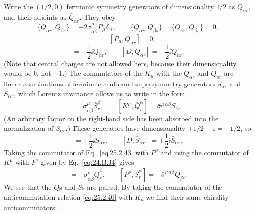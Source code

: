Write the \((1/2,0)\) fermionic symmetry generators of dimensionality
\(1/2\) as \(Q_{\alpha r}\), and their adjoints as
\(\bar Q_{\dot\alpha r}\).  They obey
\begin{equation}
\{Q_{\alpha r},\bar Q_{\dot\beta s}\}
=-2\sigma^\mu_{\alpha\dot\beta}P_\mu\delta_{rs},
\qquad
\{Q_{\alpha r},Q_{\beta s}\}
=\{\bar Q_{\dot\alpha r},\bar Q_{\dot\beta s}\}=0,
\tag{25.2.40}\label{eq:25.2.40}
\end{equation}
\begin{equation}
[P_\mu,Q_{\alpha r}]
=[P_\mu,\bar Q_{\dot\alpha r}]=0,
\tag{25.2.41}\label{eq:25.2.41}
\end{equation}
\begin{equation}
[D,Q_{\alpha r}]=-\frac12\ii Q_{\alpha r},
\qquad
[D,\bar Q_{\dot\alpha r}]=-\frac12\ii\bar Q_{\dot\alpha r}.
\tag{25.2.42}\label{eq:25.2.42}
\end{equation}
(Note that central charges are not allowed here, because their
dimensionality would be 0, not \(+1\).) The commutators of the \(K_\mu\)
with the \(Q_{\alpha r}\) and \(\bar Q_{\dot\alpha r}\) are linear
combinations of fermionic conformal-supersymmetry generators
\(S_{\alpha r}\) and \(\bar S_{\dot\alpha r}\), which Lorentz invariance
allows us to write in the form
\begin{equation}
[K^\mu,Q_{\alpha r}]
=\sigma^\mu_{\alpha\dot\beta}\bar S_r^{\dot\beta},
\qquad
[K^\mu,\bar Q_r^{\dot\alpha}]
=\bar\sigma^{\mu\,\dot\alpha\beta}S_{\beta r}.
\tag{25.2.43}\label{eq:25.2.43}
\end{equation}
(An arbitrary factor on the right-hand side has been absorbed into the
normalization of \(S_{\alpha r}\).) These generators have dimensionality
\(+1/2-1=-1/2\), so
\begin{equation}
[D,S_{\alpha r}]=+\frac12\ii S_{\alpha r},
\qquad
[D,\bar S_{\dot\alpha r}]=+\frac12\ii\bar S_{\dot\alpha r}.
\tag{25.2.44}\label{eq:25.2.44}
\end{equation}
Taking the commutator of Eq.~\eqref{eq:25.2.43} with \(P^\nu\) and using
the commutator of \(K^\mu\) with \(P^\nu\) given by
Eq.~\eqref{eq:24.B.34} gives
\begin{equation}
[P^\nu,S_{\alpha r}]
=-\sigma^\nu_{\alpha\dot\beta}\bar Q_r^{\dot\beta},
\qquad
[P^\nu,\bar S_r^{\dot\alpha}]
=-\bar\sigma^{\nu\,\dot\alpha\beta}Q_{\beta r}.
\tag{25.2.45}\label{eq:25.2.45}
\end{equation}
We see that the \(Q\)s and \(S\)s are paired. By
taking the commutator of the anticommutation relation \eqref{eq:25.2.40}
with \(K_\mu\) we find their same-chirality anticommutators:
